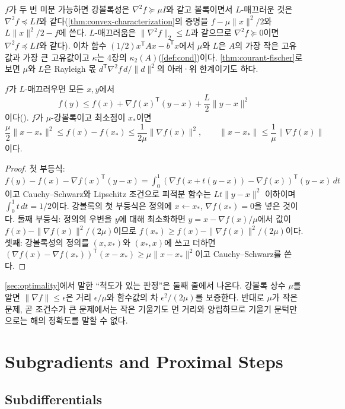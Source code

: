 $f$가 두 번 미분 가능하면 강볼록성은 $\nabla^2f\succeq\mu I$와 같고 볼록이면서 $L$-매끄러운 것은 $\nabla^2f\preceq LI$와 같다(\cref{thm:convex-characterization}의 증명을 $f-\mu\|x\|^2/2$와 $L\|x\|^2/2-f$에 쓴다. $L$-매끄러움은 $\|\nabla^2f\|_2\le L$과 같으므로 $\nabla^2f\succeq0$이면 $\nabla^2f\preceq LI$와 같다). 이차 함수 $(1/2)x^{\mathsf T}Ax-b^{\mathsf T}x$에서 $\mu$와 $L$은 $A$의 가장 작은 고유값과 가장 큰 고유값이고 $\kappa$는 4장의 $\kappa_2(A)$(\cref{def:cond})이다. \cref{thm:courant-fischer}로 보면 $\mu$와 $L$은 Rayleigh 몫 $d^{\mathsf T}\nabla^2f\,d/\|d\|^2$의 아래·위 한계이기도 하다.

\begin{proposition}
\label{prop:descent-lemma}
$f$가 $L$-매끄러우면 모든 $x,y$에서
\[
f(y)\le f(x)+\nabla f(x)^{\mathsf T}(y-x)+\frac L2\|y-x\|^2
\]
이다(). $f$가 $\mu$-강볼록이고 최소점이 $x_\ast$이면
\[
\frac\mu2\|x-x_\ast\|^2\le f(x)-f(x_\ast)\le\frac1{2\mu}\|\nabla f(x)\|^2,\qquad\|x-x_\ast\|\le\frac1\mu\|\nabla f(x)\|
\]
이다.
\end{proposition}

\begin{proof}
첫 부등식: $f(y)-f(x)-\nabla f(x)^{\mathsf T}(y-x)=\int_0^1(\nabla f(x+t(y-x))-\nabla f(x))^{\mathsf T}(y-x)\,dt$이고 Cauchy--Schwarz와 Lipschitz 조건으로 피적분 함수는 $Lt\|y-x\|^2$ 이하이며 $\int_0^1t\,dt=1/2$이다. 강볼록의 첫 부등식은 정의에 $x\leftarrow x_\ast$, $\nabla f(x_\ast)=0$을 넣은 것이다. 둘째 부등식: 정의의 우변을 $y$에 대해 최소화하면 $y=x-\nabla f(x)/\mu$에서 값이 $f(x)-\|\nabla f(x)\|^2/(2\mu)$이므로 $f(x_\ast)\ge f(x)-\|\nabla f(x)\|^2/(2\mu)$이다. 셋째: 강볼록성의 정의를 $(x,x_\ast)$와 $(x_\ast,x)$에 쓰고 더하면 $(\nabla f(x)-\nabla f(x_\ast))^{\mathsf T}(x-x_\ast)\ge\mu\|x-x_\ast\|^2$이고 Cauchy--Schwarz를 쓴다.
\end{proof}

\cref{sec:optimality}에서 말한 ``척도가 있는 판정''은 둘째 줄에서 나온다. 강볼록 상수 $\mu$를 알면 $\|\nabla f\|\le\epsilon$은 거리 $\epsilon/\mu$와 함수값의 차 $\epsilon^2/(2\mu)$를 보증한다. 반대로 $\mu$가 작은 문제, 곧 조건수가 큰 문제에서는 작은 기울기도 먼 거리와 양립하므로 기울기 문턱만으로는 해의 정확도를 말할 수 없다.

\section{Subgradients and Proximal Steps}
\label{sec:subgradients}

\subsection{Subdifferentials}

